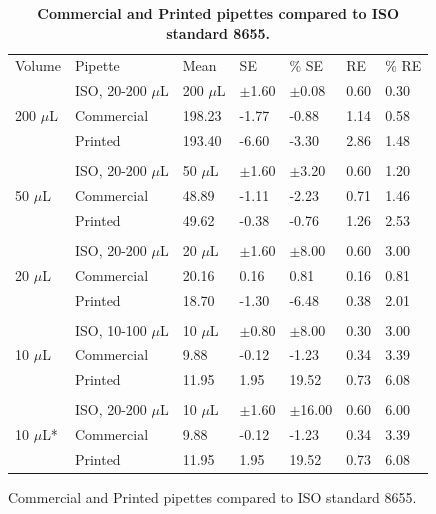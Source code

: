 \documentclass[10pt,letterpaper]{article}
\begin{document}
\begin{table}[]
\centering
\caption{\bfseries{Commercial and Printed pipettes compared to ISO standard 8655.}}
\label{my-label}
\begin{tabular}{lllllll}
Volume & Pipette & Mean   & SE    & \% SE & RE & \% RE \\
       & ISO, 20-200 $\mu$L & 200 $\mu$L       & $\pm$1.60         & $\pm$0.08          & 0.60 & 0.30 \\
200 $\mu$L & Commercial & 198.23       & -1.77        & -0.88         & 1.14 & 0.58 \\
       & Printed  & 193.40       & -6.60        & -3.30         & 2.86 & 1.48 \\
       &                     &              &              &               &      &      \\
       & ISO, 20-200 $\mu$L & 50 $\mu$L        & $\pm$1.60         &$\pm$3.20          & 0.60 & 1.20 \\
50 $\mu$L  & Commercial   & 48.89        & -1.11        & -2.23         & 0.71 & 1.46 \\
       & Printed      & 49.62        & -0.38        & -0.76         & 1.26 & 2.53 \\
       &                     &              &              &               &      &      \\
       & ISO, 20-200 $\mu$L & 20 $\mu$L        & $\pm$1.60         & $\pm$8.00          & 0.60 & 3.00 \\
20 $\mu$L  & Commercial   & 20.16        & 0.16         & 0.81          & 0.16 & 0.81 \\
       & Printed     & 18.70        & -1.30        & -6.48         & 0.38 & 2.01 \\
       &                     &              &              &               &      &      \\
       & ISO, 10-100 $\mu$L & 10 $\mu$L        & $\pm$0.80         & $\pm$8.00          & 0.30 & 3.00 \\
10 $\mu$L  & Commercial   & 9.88         & -0.12        & -1.23         & 0.34 & 3.39 \\
       & Printed      & 11.95        & 1.95         & 19.52         & 0.73 & 6.08 \\
       &                     &              &              &               &      &      \\
       & ISO, 20-200 $\mu$L & 10 $\mu$L        & $\pm$1.60         & $\pm$16.00         & 0.60 & 6.00 \\
10 $\mu$L* & Commercial   & 9.88         & -0.12        & -1.23         & 0.34 & 3.39 \\
       & Printed      & 11.95        & 1.95         & 19.52         & 0.73 & 6.08
\end{tabular}
\begin{flushleft} Commercial and Printed pipettes compared to ISO standard 8655.
\end{flushleft}
\label{table1}
\end{table}
\end{document}
